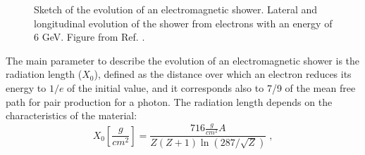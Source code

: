 \begin{figure}[ht]
\centering
{}
\caption{ Sketch of the evolution of an electromagnetic shower. 
 Lateral and longitudinal evolution of the shower from electrons with an energy of 6 GeV. Figure from Ref. \cite{grupen_shwartz_2008}.}
\label{fig:det:shower_elec}
\end{figure}


The main parameter to describe the evolution of an electromagnetic shower is the radiation length ($X_0$), defined as the distance over which an electron reduces its energy to $1/e$ of the initial value, and it corresponds also to 7/9 of the mean free path for pair production for a photon. The radiation length depends on the characteristics of the material:
\begin{equation}
X_0 [\frac{g}{cm^2}] = \frac{716 \frac{g}{ cm^2} A }{Z(Z+1) \ln\left(287/\sqrt{Z}\right)} \; ,
\end{equation}

